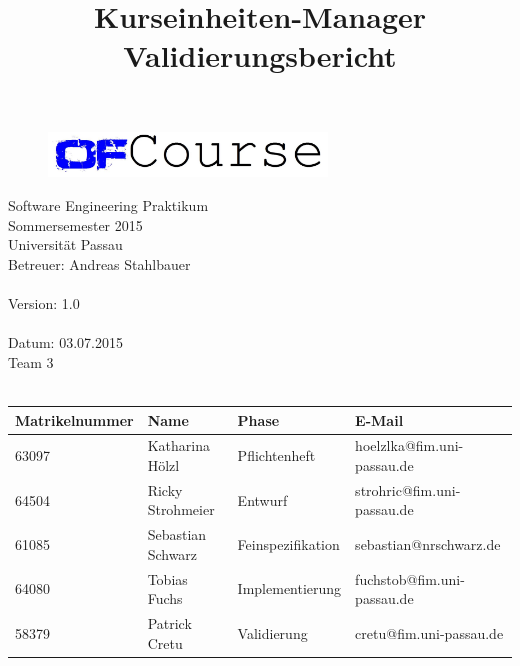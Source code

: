 \documentclass[a4paper, 12pt]{scrreprt}
\begin{document}
	\thispagestyle{plain}

\begin{titlepage}
    \begin{center}
        \begin{figure}[ht]
            \centering
            \includegraphics[width=0.66\textwidth, angle=0]{logo/name_blau_ofCourse.jpg}
        \end{figure}

    	\begin{title}
        	\title{\Huge{\textbf{Kurseinheiten-Manager \\ Validierungsbericht\\}}}

		\end{title}
		\hspace{3cm}

        	Software Engineering Praktikum \\
        	Sommersemester 2015\\
        	Universität Passau\\


        	Betreuer: Andreas Stahlbauer \\
        	\hspace{1,5cm}\\
        	Version: 1.0 \\
        	\hspace{1,5cm}\\
        	Datum: 03.07.2015\\[50pt]
        	Team 3 \\
    
		    \ \\
        
        \begin{tabular}{ | l | l | l | l |}
        	\hline
        	\textbf{Matrikelnummer} & \textbf{Name} & \textbf{Phase} & \textbf{E-Mail}  \\ \hline
        	63097 & Katharina Hölzl & Pflichtenheft & hoelzlka@fim.uni-passau.de \\ \hline
        	64504 & Ricky Strohmeier& Entwurf & strohric@fim.uni-passau.de  \\ \hline
        	61085 & Sebastian Schwarz & Feinspezifikation & sebastian@nrschwarz.de \\ \hline 
        	64080 & Tobias Fuchs & Implementierung  &  fuchstob@fim.uni-passau.de\\ \hline
        	58379 & Patrick Cretu  &  Validierung & cretu@fim.uni-passau.de \\ \hline
        \end{tabular}
        
        \ \\
        \ \\
       
        
        
    \end{center}
\end{titlepage}


\tableofcontents








\end{document}
